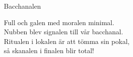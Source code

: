 \begin{song}{Bacchanalen}
	
	
	
	
	Full och galen med moralen minimal.\\
	Nubben blev signalen till vår bacchanal.\\
	Ritualen i lokalen är att tömma sin pokal,\\
	så skanalen i finalen blir total!
	
\end{song}
